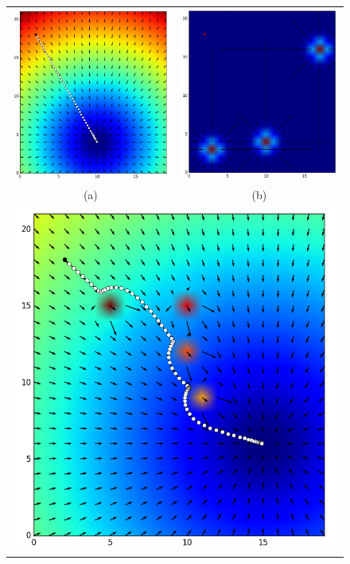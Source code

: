 \begin{figure}%
  \centering
  \begin{tabular}{cc}
     \includegraphics[width=0.45\linewidth]{images/attr_force.png}&
     \includegraphics[width=0.45\linewidth]{images/rep_force.png}\\
    (a) & (b)\\
    \multicolumn{2}{c}{\includegraphics[width=0.50\linewidth]{images/nav_force.png}}\\

\end{tabular}
\end{figure}
